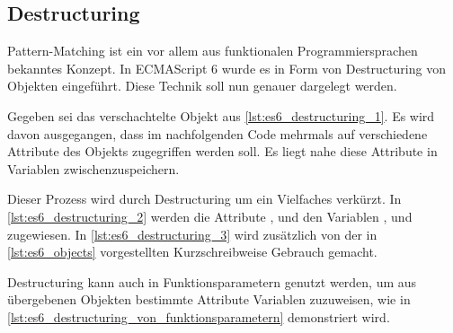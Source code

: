 \subsection{Destructuring}
\label{ssec:ge_destructuring}

Pattern-Matching ist ein vor allem aus funktionalen Programmiersprachen
bekanntes Konzept.  In ECMAScript 6 wurde es in Form von Destructuring von
Objekten eingeführt.  Diese Technik soll nun genauer dargelegt werden.

Gegeben sei das verschachtelte Objekt  aus
\cref{lst:es6_destructuring_1}.  Es wird davon ausgegangen, dass im
nachfolgenden Code mehrmals auf verschiedene Attribute des Objekts zugegriffen
werden soll.  Es liegt nahe diese Attribute in Variablen zwischenzuspeichern.



Dieser Prozess wird durch Destructuring um ein Vielfaches verkürzt.  In
\cref{lst:es6_destructuring_2} werden die Attribute ,  und
 den Variablen ,  und 
zugewiesen.  In \cref{lst:es6_destructuring_3} wird zusätzlich von der in
\cref{lst:es6_objects} vorgestellten Kurzschreibweise Gebrauch gemacht.





Destructuring kann auch in Funktionsparametern genutzt werden, um aus
übergebenen Objekten bestimmte Attribute Variablen zuzuweisen, wie in
\cref{lst:es6_destructuring_von_funktionsparametern} demonstriert wird.


